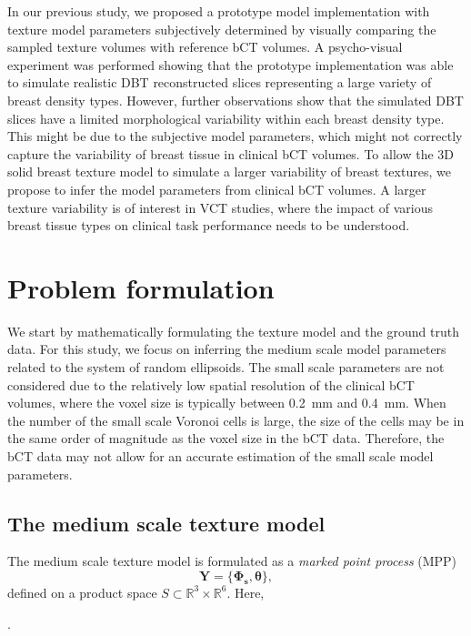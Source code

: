 \documentclass[journal]{IEEEtran}
\begin{document}
In our previous study, we proposed a prototype model implementation
with texture model parameters subjectively determined by visually
comparing the sampled texture volumes with reference bCT volumes. A
psycho-visual experiment was performed showing that the prototype
implementation was able to simulate realistic DBT reconstructed slices
representing a large variety of breast density types. However, further
observations show that the simulated DBT slices have a limited
morphological variability within each breast density type. This might
be due to the subjective model parameters, which might not correctly
capture the variability of breast tissue in clinical bCT volumes. To
allow the 3D solid breast texture model to simulate a larger
variability of breast textures, we propose to infer the model
parameters from clinical bCT volumes. A larger texture variability is
of interest in VCT studies, where the impact of various breast tissue
types on clinical task performance needs to be understood.

\section{Problem formulation}
\label{sec:problem-formulation}

We start by mathematically formulating the texture model and the
ground truth data. For this study, we focus on inferring the
medium scale model parameters related to the system of random
ellipsoids. The small scale parameters are not considered due to the
relatively low spatial resolution of the clinical bCT volumes, where
the voxel size is typically between \SI{0.2}{\mm} and
\SI{0.4}{\mm}. When the number of the small scale Voronoi cells is
large, the size of the cells may be in the same order of magnitude as
the voxel size in the bCT data. Therefore, the bCT data may not allow
for an accurate estimation of the small scale model parameters.

\subsection{The medium scale texture model}
\label{sec:medium-scale-texture}

The medium scale texture model is formulated as a \textit{marked point
  process} (MPP)
$$
\mathbf{Y} = \{ \mathbf{\Phi_{s}},\boldsymbol{\theta} \},
$$
defined on a product space
$S \subset \mathbb{R}^{3} \times \mathbb{R}^6$. Here,

\cite{chiu2013stochastic}.
\end{document}
